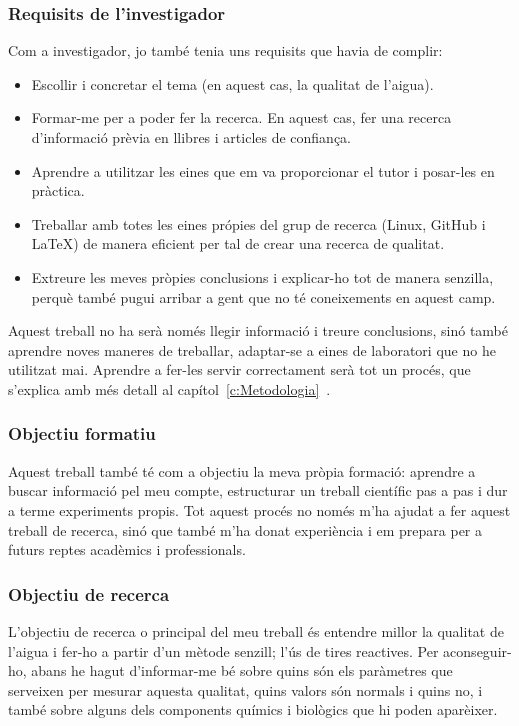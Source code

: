 \subsubsection*{Requisits de l'investigador}
Com a investigador, jo també tenia uns requisits que havia de complir:
\begin{itemize}
    \item Escollir i concretar el tema (en aquest cas, la qualitat de l’aigua).
    \item Formar-me per a poder fer la recerca. En aquest cas, fer una recerca d'informació prèvia en llibres i articles de confiança.
    \item Aprendre a utilitzar les eines que em va proporcionar el tutor i posar-les en pràctica.
    \item Treballar amb totes les eines própies del grup de recerca (Linux, GitHub i LaTeX) de manera eficient per tal de crear una recerca de qualitat.
    \item Extreure les meves pròpies conclusions i explicar-ho tot de manera senzilla, perquè també pugui arribar a gent que no té coneixements en aquest camp.
\end{itemize}

Aquest treball no ha serà només llegir informació i treure conclusions, sinó també aprendre noves maneres de treballar, adaptar-se a eines de laboratori que no he utilitzat mai. Aprendre a fer-les servir correctament serà tot un procés, que s'explica amb més detall al capítol~\ref{c:Metodologia}~.

\subsubsection{Objectiu formatiu}
Aquest treball també té com a objectiu la meva pròpia formació: aprendre a buscar informació pel meu compte, estructurar un treball científic pas a pas i dur a terme experiments propis. Tot aquest procés no només m’ha ajudat a fer aquest treball de recerca, sinó que també m’ha donat experiència i em prepara per a futurs reptes acadèmics i professionals.

\subsubsection{Objectiu de recerca}
L’objectiu de recerca o principal del meu treball és entendre millor la qualitat de l’aigua i fer-ho a partir d’un mètode senzill; l’ús de tires reactives. Per aconseguir-ho, abans he hagut d’informar-me bé sobre quins són els paràmetres que serveixen per mesurar aquesta qualitat, quins valors són normals i quins no, i també sobre alguns dels components químics i biològics que hi poden aparèixer.



